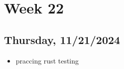 \newpage
\section{Week 22}

\subsection{Thursday, 11/21/2024}
\begin{itemize}
    \item praccing rust testing
\end{itemize}
